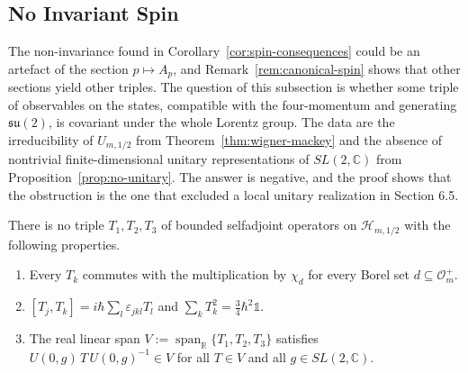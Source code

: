 \subsection{No Invariant Spin}
\label{subsec:no-invariant-spin}

The non-invariance found in Corollary~\ref{cor:spin-consequences} could be an artefact of the section $p\mapsto A_p$, and Remark~\ref{rem:canonical-spin} shows that other sections yield other triples. The question of this subsection is whether some triple of observables on the states, compatible with the four-momentum and generating $\mathfrak{su}(2)$, is covariant under the whole Lorentz group. The data are the irreducibility of $U_{m,1/2}$ from Theorem~\ref{thm:wigner-mackey} and the absence of nontrivial finite-dimensional unitary representations of $SL(2,\mathbb{C})$ from Proposition~\ref{prop:no-unitary}. The answer is negative, and the proof shows that the obstruction is the one that excluded a local unitary realization in Section 6.5.

\begin{theorem}\label{thm:no-invariant-spin}
	There is no triple $T_1,T_2,T_3$ of bounded selfadjoint operators on $\mathcal{H}_{m,1/2}$ with the following properties.
	\begin{enumerate}
		\item[\textup{S1}] Every $T_k$ commutes with the multiplication by $\chi_d$ for every Borel set $d\subseteq\mathcal{O}_m^+$.
		\item[\textup{S2}] $[T_j,T_k]=i\hbar\sum_l\varepsilon_{jkl}T_l$ and $\sum_kT_k^2=\frac34\hbar^2\mathbb{1}$.
		\item[\textup{S3}] The real linear span $V:=\operatorname{span}_{\mathbb{R}}\{T_1,T_2,T_3\}$ satisfies $U(0,g)\,T\,U(0,g)^{-1}\in V$ for all $T\in V$ and all $g\in SL(2,\mathbb{C})$.
	\end{enumerate}
\end{theorem}

